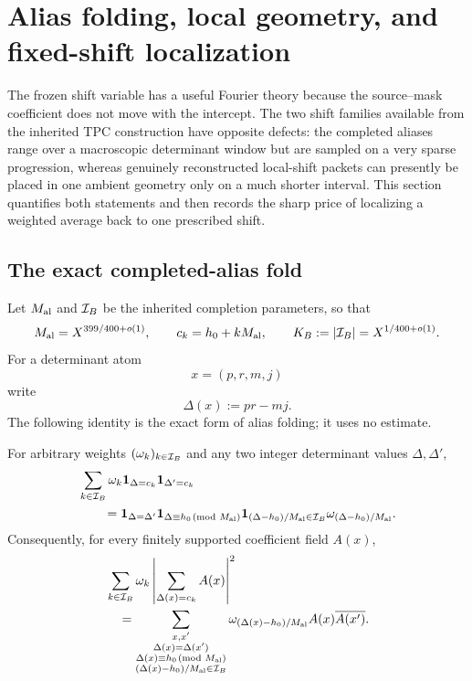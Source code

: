 \section{Alias folding, local geometry, and fixed-shift localization}
\label{sec:tpc46-alias-localization}

The frozen shift variable has a useful Fourier theory because the
source--mask coefficient does not move with the intercept.  The two
shift families available from the inherited TPC construction have
opposite defects: the completed aliases range over a macroscopic
determinant window but are sampled on a very sparse progression, whereas
genuinely reconstructed local-shift packets can presently be placed in
one ambient geometry only on a much shorter interval.  This section
quantifies both statements and then records the sharp price of
localizing a weighted average back to one prescribed shift.

\subsection{The exact completed-alias fold}

Let \(M_{\rm al}\) and \(\mathcal I_B\) be the inherited completion parameters,
so that
\begin{equation}
 M_{\rm al}=X^{399/400+o(1)},\qquad
 c_k=h_0+kM_{\rm al},\qquad
 K_B:=|\mathcal I_B|=X^{1/400+o(1)}.
 \label{eq:tpc46-alias-scales}
\end{equation}
For a determinant atom
\[
 x=(p,r,m,j)
\]
write
\begin{equation}
 \Delta(x):=pr-mj.
 \label{eq:tpc46-determinant-value}
\end{equation}
The following identity is the exact form of alias folding; it uses no
estimate.

\begin{lemma}
\label{lem:tpc46-weighted-alias-selector}
For arbitrary weights \((\omega_k)_{k\in\mathcal I_B}\) and any two integer
determinant values \(\Delta,\Delta'\),
\begin{align}
 &\sum_{k\in\mathcal I_B}\omega_k
   \mathbf 1_{\Delta=c_k}\mathbf 1_{\Delta'=c_k}
 \notag\\
 &\qquad=
 \mathbf 1_{\Delta=\Delta'}
 \mathbf 1_{\Delta\equiv h_0\!\!\pmod {M_{\rm al}}}
 \mathbf 1_{(\Delta-h_0)/M_{\rm al}\in\mathcal I_B}
 \omega_{(\Delta-h_0)/M_{\rm al}}.
 \label{eq:tpc46-weighted-alias-selector}
\end{align}
Consequently, for every finitely supported coefficient field \(A(x)\),
\begin{align}
 &\sum_{k\in\mathcal I_B}\omega_k
 \left|\sum_{\Delta(x)=c_k}A(x)\right|^2
 \notag\\
 &\quad=
 \sum_{\substack{x,x'\\
                  \Delta(x)=\Delta(x')\\
                  \Delta(x)\equiv h_0\!\!\pmod {M_{\rm al}}\\
                  (\Delta(x)-h_0)/M_{\rm al}\in\mathcal I_B}}
 \omega_{(\Delta(x)-h_0)/M_{\rm al}}
 A(x)\overline{A(x')}.
 \label{eq:tpc46-alias-equal-determinant}
\end{align}
\end{lemma}

